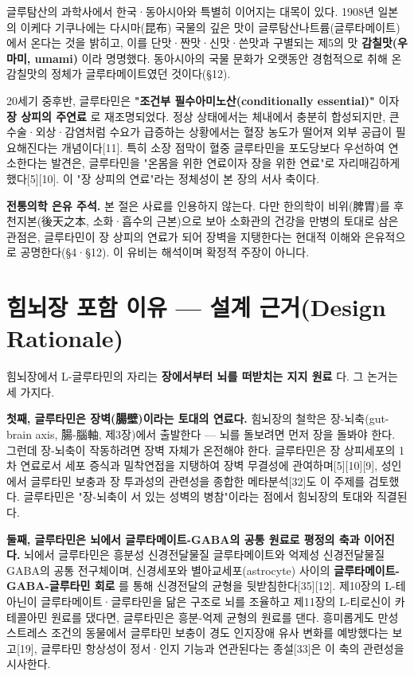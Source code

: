 \documentclass[11pt,oneside]{book}
\newenvironment{authnote}
  {\par\smallskip\begingroup\leftskip=7mm\rightskip=5mm\small\color{muted}\noindent\ignorespaces}
  {\par\endgroup\smallskip}
\begin{document}
글루탐산의 과학사에서 한국·동아시아와 특별히 이어지는 대목이 있다. 1908년 일본의 이케다 기쿠나에는 다시마(昆布) 국물의 깊은 맛이 글루탐산나트륨(글루타메이트)에서 온다는 것을 밝히고, 이를 단맛·짠맛·신맛·쓴맛과 구별되는 제5의 맛 \textbf{감칠맛(우마미, umami)} 이라 명명했다. 동아시아의 국물 문화가 오랫동안 경험적으로 취해 온 감칠맛의 정체가 글루타메이트였던 것이다(§12).

20세기 중후반, 글루타민은 \textbf{"조건부 필수아미노산(conditionally essential)"} 이자 \textbf{장 상피의 주연료} 로 재조명되었다. 정상 상태에서는 체내에서 충분히 합성되지만, 큰 수술·외상·감염처럼 수요가 급증하는 상황에서는 혈장 농도가 떨어져 외부 공급이 필요해진다는 개념이다[11]. 특히 소장 점막이 혈중 글루타민을 포도당보다 우선하여 연소한다는 발견은, 글루타민을 "온몸을 위한 연료이자 장을 위한 연료"로 자리매김하게 했다[5][10]. 이 "장 상피의 연료"라는 정체성이 본 장의 서사 축이다.

\begin{authnote}\textbf{전통의학 은유 주석.} 본 절은 사료를 인용하지 않는다. 다만 한의학이 비위(脾胃)를 후천지본(後天之本, 소화·흡수의 근본)으로 보아 소화관의 건강을 만병의 토대로 삼은 관점은, 글루타민이 장 상피의 연료가 되어 장벽을 지탱한다는 현대적 이해와 은유적으로 공명한다(§4·§12). 이 유비는 해석이며 확정적 주장이 아니다.\end{authnote}
\section{힘뇌장 포함 이유 — 설계 근거(Design Rationale)}
힘뇌장에서 L-글루타민의 자리는 \textbf{장에서부터 뇌를 떠받치는 지지 원료} 다. 그 논거는 세 가지다.

\textbf{첫째, 글루타민은 장벽(腸壁)이라는 토대의 연료다.} 힘뇌장의 철학은 장-뇌축(gut-brain axis, 腸-腦軸, 제3장)에서 출발한다 — 뇌를 돌보려면 먼저 장을 돌봐야 한다. 그런데 장-뇌축이 작동하려면 장벽 자체가 온전해야 한다. 글루타민은 장 상피세포의 1차 연료로서 세포 증식과 밀착연접을 지탱하여 장벽 무결성에 관여하며[5][10][9], 성인에서 글루타민 보충과 장 투과성의 관련성을 종합한 메타분석[32]도 이 주제를 검토했다. 글루타민은 "장-뇌축이 서 있는 성벽의 병참"이라는 점에서 힘뇌장의 토대와 직결된다.

\textbf{둘째, 글루타민은 뇌에서 글루타메이트-GABA의 공통 원료로 평정의 축과 이어진다.} 뇌에서 글루타민은 흥분성 신경전달물질 글루타메이트와 억제성 신경전달물질 GABA의 공통 전구체이며, 신경세포와 별아교세포(astrocyte) 사이의 \textbf{글루타메이트-GABA-글루타민 회로} 를 통해 신경전달의 균형을 뒷받침한다[35][12]. 제10장의 L-테아닌이 글루타메이트·글루타민을 닮은 구조로 뇌를 조율하고 제11장의 L-티로신이 카테콜아민 원료를 댔다면, 글루타민은 흥분-억제 균형의 원료를 댄다. 흥미롭게도 만성 스트레스 조건의 동물에서 글루타민 보충이 경도 인지장애 유사 변화를 예방했다는 보고[19], 글루타민 항상성이 정서·인지 기능과 연관된다는 종설[33]은 이 축의 관련성을 시사한다.
\end{document}
